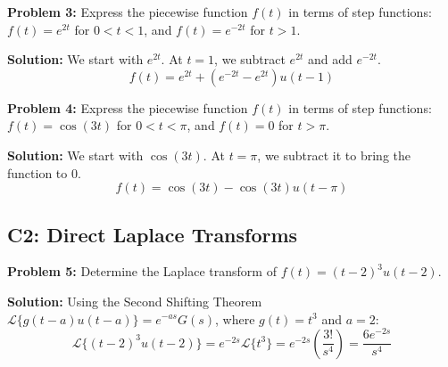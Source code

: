 \documentclass[11pt, letterpaper]{article}
\theoremstyle{definition}
\theoremstyle{remark}
\newcommand{\Lap}{\mathcal{L}}
\begin{document}
\begin{center}
\end{center}

\vspace{1em}
\textbf{Problem 3:} Express the piecewise function $f(t)$ in terms of step functions: $f(t) = e^{2t}$ for $0 < t < 1$, and $f(t) = e^{-2t}$ for $t > 1$.

\textbf{Solution:}
We start with $e^{2t}$. At $t=1$, we subtract $e^{2t}$ and add $e^{-2t}$.
\[ f(t) = e^{2t} + (e^{-2t} - e^{2t})u(t-1) \]

\vspace{1em}
\textbf{Problem 4:} Express the piecewise function $f(t)$ in terms of step functions: $f(t) = \cos(3t)$ for $0 < t < \pi$, and $f(t) = 0$ for $t > \pi$.

\textbf{Solution:}
We start with $\cos(3t)$. At $t=\pi$, we subtract it to bring the function to $0$.
\[ f(t) = \cos(3t) - \cos(3t)u(t-\pi) \]

\subsection{C2: Direct Laplace Transforms}

\textbf{Problem 5:} Determine the Laplace transform of $f(t) = (t-2)^3 u(t-2)$.

\textbf{Solution:}
Using the Second Shifting Theorem $\Lap\{g(t-a)u(t-a)\} = e^{-as}G(s)$, where $g(t) = t^3$ and $a = 2$:
\[ \Lap\{(t-2)^3 u(t-2)\} = e^{-2s} \Lap\{t^3\} = e^{-2s} \left( \frac{3!}{s^4} \right) = \frac{6e^{-2s}}{s^4} \]
\end{document}
